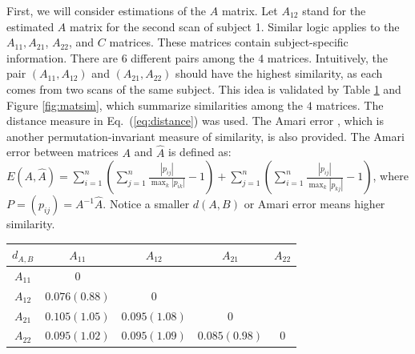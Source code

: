 \documentclass[times,twocolumn,final,authoryear]{elsarticle}
\let\oldref\ref
\renewcommand{\ref}[1]{(\oldref{#1})}
\begin{document}
First, we will consider estimations of the $A$ matrix. Let $A_{12}$ stand for the estimated $A$ matrix for the second scan of subject 1. Similar logic applies to the $A_{11}, A_{21}$, $A_{22}$, and $C$ matrices. These matrices contain subject-specific information. There are $6$ different pairs among the $4$ matrices. Intuitively, the pair $(A_{11},A_{12})$ and $(A_{21},A_{22})$ should have the highest similarity, as each comes from two scans of the same subject. This idea is validated by Table \oldref{tab:similarity} and Figure \oldref{fig:matsim}, which summarize similarities among the  $4$ matrices. The distance measure in Eq.~\ref{eq:distance} was used. The Amari error \citep{amari1996new}, which is another permutation-invariant measure of similarity, is also provided. The Amari error between matrices $A$ and $\hat{A}$ is defined as: $E(A,\hat{A}) = \sum\limits_{i=1}^n(\sum\limits_{j=1}^n\frac{|p_{ij}|}{\max_k |p_{ik}|}-1) + \sum\limits_{j=1}^n(\sum\limits_{i=1}^n\frac{|p_{ij}|}{\max_k|p_{kj}|}-1)$, where $P =(p_{ij})=A^{-1}\hat{A}$. Notice a smaller $d(A,B)$ or Amari error means higher similarity.
\begin{table}
\centering
{}
\label{tab:similarity}
\begin{tabular}{c|cccc}
\hline
$d_{A,B}$ & $A_{11}$&$A_{12}$ & $A_{21}$&$A_{22}$ \\
\hline
$A_{11}$ & $0$ &  &  &\\
$A_{12}$ & $\mathbf{0.076(0.88)}$& $0$ & &\\
$A_{21}$ & $0.105(1.05)$ & $0.095(1.08)$  & $0$ &\\
$A_{22}$ & $0.095(1.02)$ & $0.095(1.09)$ & $\mathbf{0.085(0.98)}$ & $0$ \\
\hline
\end{tabular}
\end{table}
\end{document}
